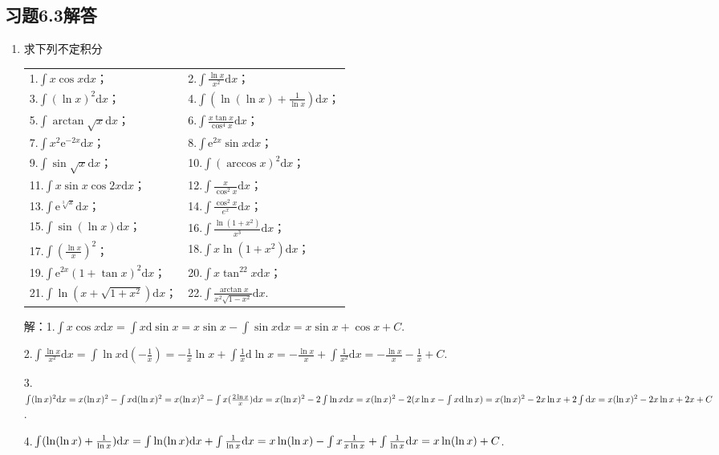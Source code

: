 \documentclass[12pt,UTF8]{ctexart}
\begin{document}
\subsection{习题6.3解答}
\begin{enumerate}
\item[]求下列不定积分
\newline
\begin{tabular}{ll}
1.$\int x\cos x\mathrm dx$；&2.$\int\frac{\ln x}{x^2}\mathrm dx$；\\
3.$\int(\ln x)^2\mathrm dx$；&4.$\int(\ln(\ln x)+\frac1{\ln x})\mathrm dx$；\\
5.$\int\arctan\sqrt x\mathrm dx$；&6.$\int\frac{x\tan x}{\cos^4x}\mathrm dx$；\\
7.$\int x^2\mathrm e^{-2x}\mathrm dx$；&8.$\int\mathrm e^{2x}\sin x\mathrm dx$；\\
9.$\int\sin\sqrt x\mathrm dx$；&10.$\int(\arccos x)^2\mathrm dx$；\\
11.$\int x\sin x\cos2x\mathrm dx$；&12.$\int\frac x{\cos^2x}\mathrm dx$；\\
13.$\int\mathrm e^{\sqrt[3]x}\mathrm dx$；&14.$\int\frac{\cos^2x}{e^x}\mathrm dx$；\\
15.$\int\sin(\ln x)\mathrm dx$；&16.$\int\frac{\ln(1+x^2)}{x^3}\mathrm dx$；\\
17.$\int(\frac{\ln x}x)^2$；&18.$\int x\ln(1+x^2)\mathrm dx$；\\
19.$\int\mathrm e^{2x}(1+\tan x)^2\mathrm dx$；&20.$\int x\tan^22x\mathrm dx$；\\
21.$\int\ln(x+\sqrt{1+x^2})\mathrm dx$；&22.$\int\frac{\arctan x}{x^2\sqrt{1-x^2}}\mathrm dx$.
\end{tabular}

解：1.$\int x\cos x\mathrm dx=\int x\mathrm d\sin x=x\sin x-\int\sin x\mathrm dx=x\sin x+\cos x+C$.

2.$\int\frac{\ln x}{x^2}\mathrm dx=\int\ln x\mathrm d(-\frac1x)=-\frac1x\ln x+\int\frac1x\mathrm d\ln x=-\frac{\ln x}x+\int\frac1{x^2}\mathrm dx=-\frac{\ln x}x-\frac1x+C$.

3.$\int(\ln x)^2\mathrm dx=x(\ln x)^2-\int x\mathrm d(\ln x)^2=x(\ln x)^2-\int x(\frac{2\ln x}x)\mathrm dx=x(\ln x)^2-2\int\ln x\mathrm dx\\
=x(\ln x)^2-2(x\ln x-\int x\mathrm d\ln x)=x(\ln x)^2-2x\ln x+2\int\mathrm dx=x(\ln x)^2-2x\ln x+2x+C$.

4.$\int(\ln(\ln x)+\frac1{\ln x})\mathrm dx=\int\ln(\ln x)\mathrm dx+\int\frac1{\ln x}\mathrm dx=x\ln(\ln x)-\int x\frac1{x\ln x}+\int\frac1{\ln x}\mathrm dx\\
=x\ln(\ln x)+C$.


\end{enumerate}
\end{document}
